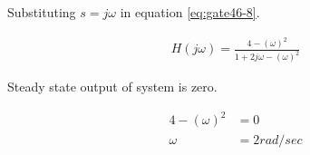 \documentclass[12pt]{article}
\begin{document}
Substituting $s=j\omega$ in equation \eqref{eq:gate46-8}.

\begin{align}
H(j\omega)=\frac{4-(\omega)^2}{1+2j\omega-(\omega)^2}
\end{align}

Steady state output of system is zero.

\begin{align}
4-(\omega)^2&=0\\
\omega&=2rad/sec
\end{align}
\end{document}
